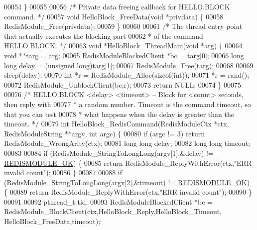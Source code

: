 \begin{DoxyCode}
00054 \}
00055 
00056 \textcolor{comment}{/* Private data freeing callback for HELLO.BLOCK command. */}
00057 \textcolor{keywordtype}{void} HelloBlock\_FreeData(\textcolor{keywordtype}{void} *privdata) \{
00058     RedisModule\_Free(privdata);
00059 \}
00060 
00061 \textcolor{comment}{/* The thread entry point that actually executes the blocking part}
00062 \textcolor{comment}{ * of the command HELLO.BLOCK. */}
00063 \textcolor{keywordtype}{void} *HelloBlock\_ThreadMain(\textcolor{keywordtype}{void} *arg) \{
00064     \textcolor{keywordtype}{void} **targ = arg;
00065     RedisModuleBlockedClient *bc = targ[0];
00066     \textcolor{keywordtype}{long} \textcolor{keywordtype}{long} delay = (\textcolor{keywordtype}{unsigned} \textcolor{keywordtype}{long})targ[1];
00067     RedisModule\_Free(targ);
00068 
00069     sleep(delay);
00070     \textcolor{keywordtype}{int} *r = RedisModule\_Alloc(\textcolor{keyword}{sizeof}(\textcolor{keywordtype}{int}));
00071     *r = rand();
00072     RedisModule\_UnblockClient(bc,r);
00073     \textcolor{keywordflow}{return} NULL;
00074 \}
00075 
00076 \textcolor{comment}{/* HELLO.BLOCK <delay> <timeout> -- Block for <count> seconds, then reply with}
00077 \textcolor{comment}{ * a random number. Timeout is the command timeout, so that you can test}
00078 \textcolor{comment}{ * what happens when the delay is greater than the timeout. */}
00079 \textcolor{keywordtype}{int} HelloBlock\_RedisCommand(RedisModuleCtx *ctx, RedisModuleString **argv, \textcolor{keywordtype}{int} argc) \{
00080     \textcolor{keywordflow}{if} (argc != 3) \textcolor{keywordflow}{return} RedisModule\_WrongArity(ctx);
00081     \textcolor{keywordtype}{long} \textcolor{keywordtype}{long} delay;
00082     \textcolor{keywordtype}{long} \textcolor{keywordtype}{long} timeout;
00083 
00084     \textcolor{keywordflow}{if} (RedisModule\_StringToLongLong(argv[1],&delay) != \hyperlink{redismodule_8h_a1bc5bfd69abcd378ff52c640adc5418d}{REDISMODULE\_OK}) \{
00085         \textcolor{keywordflow}{return} RedisModule\_ReplyWithError(ctx,\textcolor{stringliteral}{"ERR invalid count"});
00086     \}
00087 
00088     \textcolor{keywordflow}{if} (RedisModule\_StringToLongLong(argv[2],&timeout) != \hyperlink{redismodule_8h_a1bc5bfd69abcd378ff52c640adc5418d}{REDISMODULE\_OK}) \{
00089         \textcolor{keywordflow}{return} RedisModule\_ReplyWithError(ctx,\textcolor{stringliteral}{"ERR invalid count"});
00090     \}
00091 
00092     pthread\_t tid;
00093     RedisModuleBlockedClient *bc = RedisModule\_BlockClient(ctx,HelloBlock\_Reply,HelloBlock\_Timeout,
      HelloBlock\_FreeData,timeout);

\end{DoxyCode}
